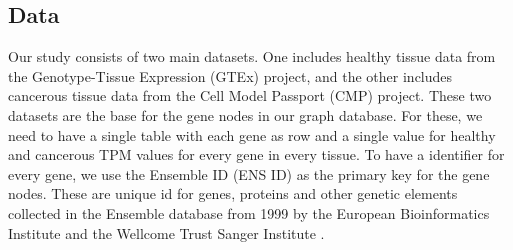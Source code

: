 \subsection{Data} \label{subsec:data}

Our study consists of two main datasets.
One includes healthy tissue data from the Genotype-Tissue Expression (GTEx) project,
and the other includes cancerous tissue data from the Cell Model Passport (CMP) project.
These two datasets are the base for the gene nodes in our graph database.
For these, we need to have a single table with each gene as row and a single value for healthy and cancerous TPM values for every gene in every tissue.
To have a identifier for every gene, we use the Ensemble ID (ENS ID) as the primary key for the gene nodes.
These are unique id for genes, proteins and other genetic elements collected in the Ensemble database
from 1999 by the European Bioinformatics Institute and the Wellcome Trust Sanger Institute \cite{ensembl_project}.
\\


